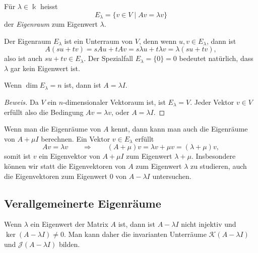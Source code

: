 \begin{definition}
Für $\lambda\in\Bbbk$ heisst
\[
E_\lambda
=
\{ v\in V \mid Av=\lambda v\}
\]
der {\em Eigenraum} zum Eigenwert $\lambda$.
%
%
\end{definition}

Der Eigenraum $E_\lambda$ ist ein Unterraum von $V$, denn wenn
$u,v\in E_\lambda$, dann ist
\[
A(su+tv)
=
sAu+tAv
=
s\lambda u + t\lambda v
=
\lambda(su+tv),
\]
also ist auch $su+tv\in E_\lambda$.
Der Spezialfall $E_\lambda = \{0\}=0$ bedeutet natürlich, dass $\lambda$ gar kein
Eigenwert ist.

\begin{satz}
Wenn $\dim E_\lambda=n$ ist, dann ist $A=\lambda I$.
\end{satz}

\begin{proof}[Beweis]
Da $V$ ein $n$-dimensionaler Vektoraum ist, ist $E_\lambda=V$.
Jeder Vektor $v\in V$ erfüllt also die Bedingung $Av=\lambda v$,
oder $A=\lambda I$.
\end{proof}

Wenn man die Eigenräume von $A$ kennt, dann kann man auch die Eigenräume
von $A+\mu I$ berechnen.
Ein Vektor $v\in E_\lambda$ erfüllt
\[
Av=\lambda v
\qquad\Rightarrow\qquad
(A+\mu)v = \lambda v + \mu v
=
(\lambda+\mu)v,
\]
somit ist $v$ ein Eigenvektor von $A+\mu I$ zum Eigenwert $\lambda+\mu$.
Insbesondere können wir statt die Eigenvektoren von $A$ zum Eigenwert $\lambda$
zu studieren, auch die Eigenvektoren zum Eigenwert $0$ von $A-\lambda I$
untersuchen.

%
%
\subsection{Verallgemeinerte Eigenräume
\label{buch:subsection:verallgemeinerte-eigenraeume}}
Wenn $\lambda$ ein Eigenwert der Matrix $A$ ist, dann ist
$A-\lambda I$ nicht injektiv und $\ker(A-\lambda I)\ne 0$.
Man kann daher die invarianten Unterräume $\mathcal{K}(A-\lambda I)$
und $\mathcal{J}(A-\lambda I)$ bilden.

